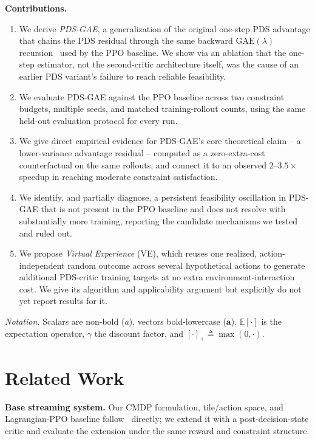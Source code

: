 \documentclass[conference]{IEEEtran}
\newcommand{\mbf}[1]{\mathbf{#1}}
\newcommand{\EE}{\mathbb{E}}
\begin{document}
\textbf{Contributions.}
\begin{enumerate}
\item We derive \emph{PDS-GAE}, a generalization of the original one-step PDS advantage
that chains the PDS residual through the same backward $\mathrm{GAE}(\lambda)$
recursion~\cite{schulman2016gae} used by the PPO baseline. We show via an ablation
that the one-step estimator, not the second-critic architecture itself, was the
cause of an earlier PDS variant's failure to reach reliable feasibility.
\item We evaluate PDS-GAE against the PPO baseline across two constraint budgets,
multiple seeds, and matched training-rollout counts, using the same held-out
evaluation protocol for every run.
\item We give direct empirical evidence for PDS-GAE's core theoretical claim -- a
lower-variance advantage residual -- computed as a zero-extra-cost counterfactual on
the same rollouts, and connect it to an observed $2$--$3.5\times$ speedup in reaching
moderate constraint satisfaction.
\item We identify, and partially diagnose, a persistent feasibility oscillation in
PDS-GAE that is not present in the PPO baseline and does not resolve with substantially
more training, reporting the candidate mechanisms we tested and ruled out.
\item We propose \emph{Virtual Experience} (VE), which reuses one realized,
action-independent random outcome across several hypothetical actions to generate
additional PDS-critic training targets at no extra environment-interaction cost. We
give its algorithm and applicability argument but explicitly do not yet report results
for it.
\end{enumerate}

\emph{Notation.} Scalars are non-bold ($a$), vectors bold-lowercase ($\mbf{a}$).
$\EE[\cdot]$ is the expectation operator, $\gamma$ the discount factor, and
$[\cdot]_+ \triangleq \max(0,\cdot)$.

\section{Related Work}

\textbf{Base streaming system.} Our CMDP formulation, tile/action space, and
Lagrangian-PPO baseline follow~\cite{ref_mmsp25} directly; we extend it with a
post-decision-state critic and evaluate the extension under the same reward and
constraint structure.
\end{document}
